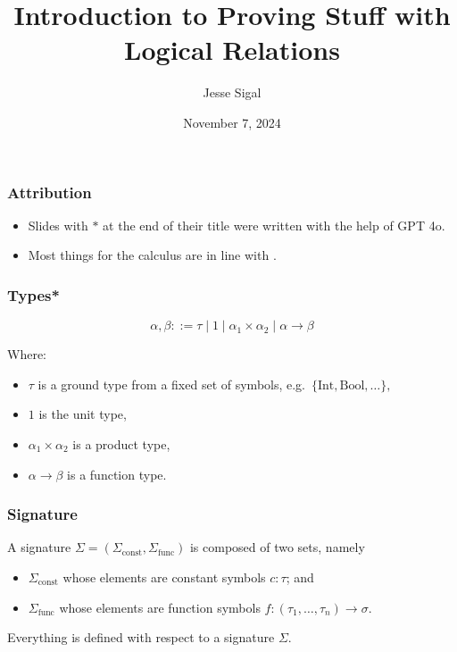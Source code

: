 \documentclass[aspectratio=169]{beamer}
\title{Introduction to Proving Stuff\textsuperscript{\texttrademark} with Logical Relations}
\author{Jesse Sigal}
\date{November 7, 2024}
\begin{document}
\begin{frame}
\titlepage
\end{frame}

\begin{frame}
\frametitle{Attribution}
\begin{itemize}
\item Slides with $*$ at the end of their title were written with the help of GPT 4o.
\item Most things for the calculus are in line with \cite{Crole_1994}.
\end{itemize}
\end{frame}

\begin{frame}
\frametitle{Types*}
\[
\alpha, \beta ::= \tau \mid 1 \mid \alpha_1 \times \alpha_2 \mid \alpha \rightarrow \beta
\]

Where:
\begin{itemize}
    \item $\tau$ is a ground type from a fixed set of symbols, e.g.\ $\{\text{Int}, \text{Bool}, \ldots\},$
    \item $1$ is the unit type,
    \item $\alpha_1 \times \alpha_2$ is a product type,
    \item $\alpha \rightarrow \beta$ is a function type.
\end{itemize}
\end{frame}

\begin{frame}
\frametitle{Signature}
A signature $\Sigma = (\Sigma_{\text{const}}, \Sigma_{\text{func}})$ is composed of two sets, namely
\begin{itemize}
    \item $\Sigma_{\text{const}}$ whose elements are constant symbols $c : \tau$; and
    \item $\Sigma_{\text{func}}$ whose elements are function symbols $f : (\tau_1, \ldots, \tau_n) \to \sigma$.
\end{itemize}
Everything is defined with respect to a signature $\Sigma$.

\end{frame}
\end{document}

